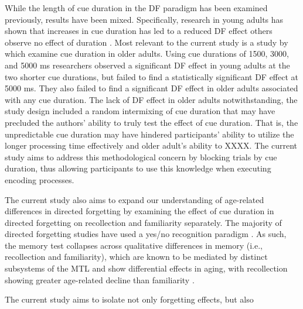 \documentclass[man]{apa6}\usepackage[]{graphicx}\usepackage[]{color}
\begin{document}
While the length of cue duration in the DF paradigm has been examined previously, results have been mixed. Specifically, research in young adults has shown that increases in cue duration has led to a reduced DF effect \parencite{lee.lee.tsai2007} others observe no effect of duration \parencite{allen.vokey1998,bancroft.hockley.farquhar2013}. Most relevant to the current study is a study by \textcite[Exp. 2]{dulaney.marks.link2004} which examine cue duration in older adults. Using cue durations of 1500, 3000, and 5000 ms researchers observed a significant DF effect in young adults at the two shorter cue durations, but failed to find a statistically significant DF effect at 5000 ms. They also failed to find a significant DF effect in older adults associated with any cue duration. The lack of DF effect in older adults notwithstanding, the study design included a random intermixing of cue duration that may have precluded the authors’ ability to truly test the effect of cue duration. That is, the unpredictable cue duration may have hindered participants’ ability to utilize the longer processing time effectively and older adult’s ability to XXXX. The current study aims to address this methodological concern by blocking trials by cue duration, thus allowing participants to use this knowledge when executing encoding processes.

The current study also aims to expand our understanding of age-related differences in directed forgetting by examining the effect of cue duration in directed forgetting on recollection and familiarity separately. The majority of directed forgetting studies have used a yes/no recognition paradigm \parencite[but see][]{gardiner.gawlik.richardson1994, rizio.dennis2013,rizio.dennis2014plos}. As such, the memory test collapses across qualitative differences in memory (i.e., recollection and familiarity), which are known to be mediated by distinct subsystems of the MTL \parencite[e.g.,][]{diana.yonelinas.ranganath2007mtl, yonelinas.et.al.2005mtl} and show differential effects in aging, with recollection showing greater age-related decline than familiarity \parencite{parkin.walter1992,jennings.jacoby1993,mantyla1993,java1996,davidson.glisky2002,yonelinas2002recfamreview,bastin.vanderlinden2003,howard.et.al2006}.

The current study aims to isolate not only forgetting effects, but also
\end{document}

